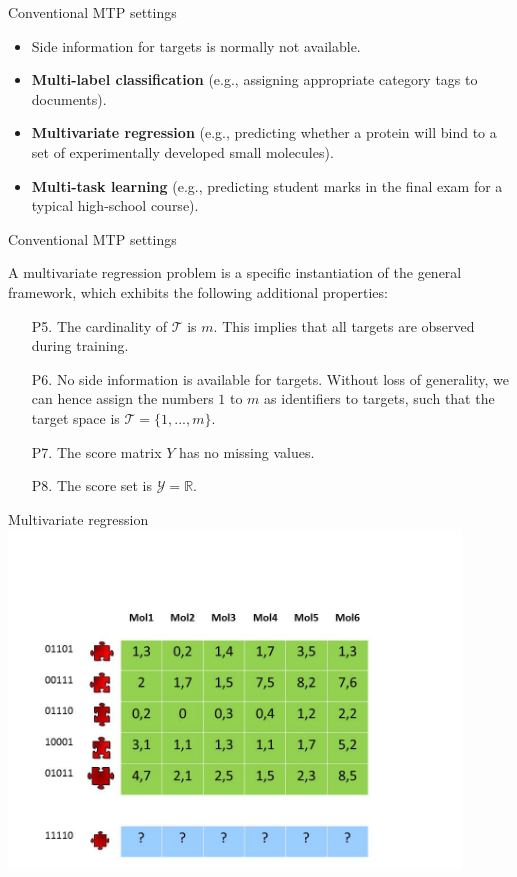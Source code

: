 \documentclass[]{beamer}
\renewcommand{\emph}[1]{\textbf{\color{putblue}#1}}
\begin{document}
\begin{frame}{Conventional MTP settings}
\begin{itemize}
\item Side information for targets is normally not available. 
\item \emph{Multi-label classification} (e.g., assigning appropriate category tags to documents).
\item \emph{Multivariate regression} (e.g., predicting whether a protein will bind to a set of experimentally developed small molecules).
\item \emph{Multi-task learning} (e.g., predicting student marks in the final exam for a typical high-school course).
\end{itemize}
\end{frame}

\begin{frame}{Conventional MTP settings}
\begin{definition} 
A multivariate regression problem is a specific instantiation of the general framework, which exhibits the following additional properties: 
\begin{enumerate}
\item[P5.] The cardinality of $\mathcal{T}$ is $m$. This implies that all targets are observed during training. 
\item[P6.] No side information is available for targets. Without loss of generality, we can hence assign the numbers $1$ to $m$ as identifiers to targets, such that the target space is $\mathcal{T} = \{1,...,m\}$. 
\item[P7.] The score matrix $Y$ has no missing values. 
\item[P8.] The score set is $\mathcal{Y} = \mathbb{R}$. 
\end{enumerate}
\end{definition}
\end{frame}


\begin{frame}{Multivariate regression}
\includegraphics[width=0.9\textwidth,trim = 0 0 100 100,clip]{Figures/pictures/Slide1}
\end{frame}
\end{document}
